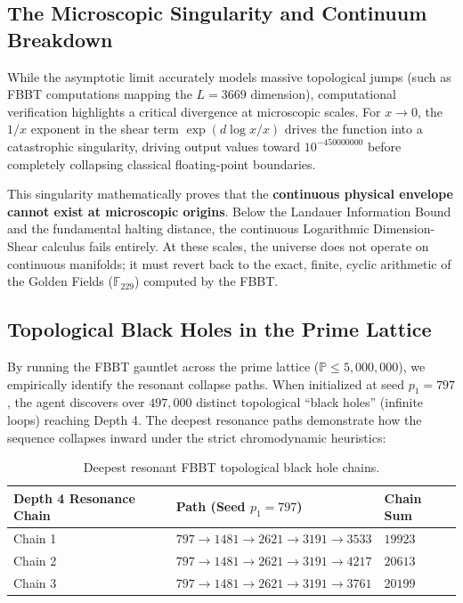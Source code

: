 \subsection{The Microscopic Singularity and Continuum Breakdown}
While the asymptotic limit accurately models massive topological jumps (such as FBBT computations mapping the $L=3669$ dimension), computational verification highlights a critical divergence at microscopic scales. For $x \to 0$, the $1/x$ exponent in the shear term $\exp(d \log x / x)$ drives the function into a catastrophic singularity, driving output values toward $10^{-450000000}$ before completely collapsing classical floating-point boundaries.

This singularity mathematically proves that the \textbf{continuous physical envelope cannot exist at microscopic origins}. Below the Landauer Information Bound and the fundamental halting distance, the continuous Logarithmic Dimension-Shear calculus fails entirely. At these scales, the universe does not operate on continuous manifolds; it must revert back to the exact, finite, cyclic arithmetic of the Golden Fields ($\mathbb{F}_{229}$) computed by the FBBT.

\subsection{Topological Black Holes in the Prime Lattice}
By running the FBBT gauntlet across the prime lattice ($\mathbb{P} \le 5,000,000$), we empirically identify the resonant collapse paths. When initialized at seed $p_1 = 797$, the agent discovers over $497,000$ distinct topological ``black holes'' (infinite loops) reaching Depth 4. 
The deepest resonance paths demonstrate how the sequence collapses inward under the strict chromodynamic heuristics:

\begin{table}[ht]
\centering
\begin{tabular}{|l|l|l|}
\hline
\textbf{Depth 4 Resonance Chain} & \textbf{Path (Seed $p_1 = 797$)} & \textbf{Chain Sum} \\
\hline
Chain 1 & $797 \to 1481 \to 2621 \to 3191 \to 3533$ & $19923$ \\
Chain 2 & $797 \to 1481 \to 2621 \to 3191 \to 4217$ & $20613$ \\
Chain 3 & $797 \to 1481 \to 2621 \to 3191 \to 3761$ & $20199$ \\
\hline
\end{tabular}
\caption{Deepest resonant FBBT topological black hole chains.}
\label{tab:fbbt_blackholes}
\end{table}

